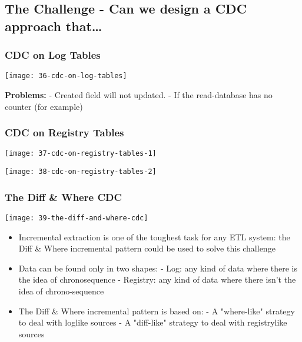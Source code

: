 \subsection{The Challenge - Can we design a CDC approach that…}

\subsubsection{CDC on Log Tables}

\begin{center}
\texttt{[image: 36-cdc-on-log-tables]}
\end{center}

\textbf{Problems:}
- Created field will not updated.
- If the read-database has no counter (for example) 

\subsubsection{CDC on Registry Tables}

\begin{center}
\texttt{[image: 37-cdc-on-registry-tables-1]}
\end{center}

\hrulefill

\begin{center}
\texttt{[image: 38-cdc-on-registry-tables-2]}
\end{center}

\subsubsection{The Diff \& Where CDC}

\begin{center}
\texttt{[image: 39-the-diff-and-where-cdc]}
\end{center}

\begin{itemize}
	\item Incremental extraction is one of the toughest task for any ETL system: the Diff \& Where incremental pattern could be used to solve this challenge
	\item Data can be found only in two shapes:
		- Log: any kind of data where there is the idea of chronosequence
		- Registry: any kind of data where there isn’t the idea of chrono-sequence
	\item The Diff \& Where incremental pattern is based on:
		- A "where-like" strategy to deal with loglike sources
		- A "diff-like" strategy to deal with registrylike sources
\end{itemize}


